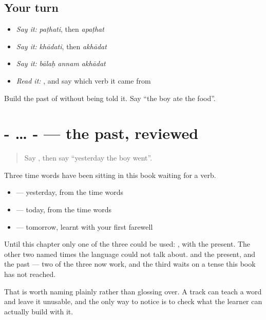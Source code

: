 \subsection*{Your turn}
\begin{itemize}
\raggedright
  \item \emph{Say it:} \emph{paṭhati}, then \emph{apaṭhat}
  \item \emph{Say it:} \emph{khādati}, then \emph{akhādat}
  \item \emph{Say it:} \emph{bālaḥ annam akhādat}
  \item \emph{Read it:} \textbf{}, and say which verb it came from
\end{itemize}

\begin{tcolorbox}[breakable,colback=teal!4,colframe=teal!35!black,title={Before you move on}]
Build the past of \textbf{} without being told it. Say \textquotedblleft{}the boy ate the food\textquotedblright{}.
\end{tcolorbox}
\section[\texorpdfstring{\sk{अ}- … -\sk{त्} (a- … -t)}{अ- … -त् (a- … -t)}]{- … - — the past, reviewed}

\label{lesson:SA-R56-past}



\begin{quote}
Say \textbf{}, then say \textquotedblleft{}yesterday the boy went\textquotedblright{}.
\end{quote}

\begin{grammarlens}[title={What you've built}]
Three time words have been sitting in this book waiting for a verb.

\begin{itemize}
\raggedright
  \item \textbf{} — yesterday, from the time words
  \item \textbf{} — today, from the time words
  \item \textbf{} — tomorrow, learnt with your first farewell
\end{itemize}

Until this chapter only one of the three could be used: \textbf{}, with the present. The other two named times the language could not talk about. \textbf{} and the present, \textbf{} and the past — two of the three now work, and the third waits on a tense this book has not reached.

That is worth naming plainly rather than glossing over. A track can teach a word and leave it unusable, and the only way to notice is to check what the learner can actually build with it.
\end{grammarlens}

